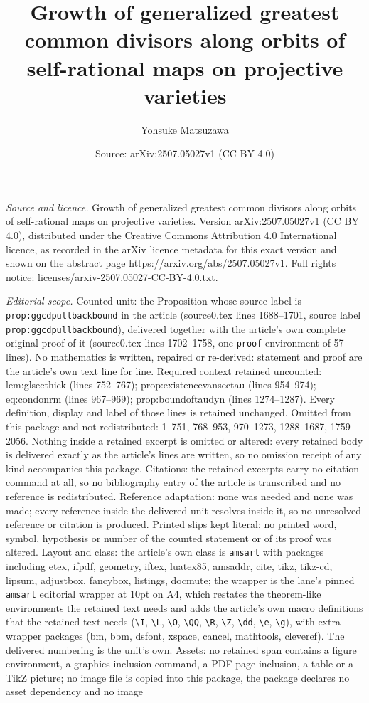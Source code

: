 \documentclass[10pt,a4paper]{amsart}
\title[Growth of generalized greatest common divisors along orbits ]{Growth of generalized greatest common divisors along orbits of self-rational maps on projective varieties}
\author{Yohsuke Matsuzawa}
\date{Source: arXiv:2507.05027v1 (CC BY 4.0)}
\begin{document}
\maketitle

\noindent\emph{Source and licence.} Growth of generalized greatest common divisors along orbits of self-rational maps on projective varieties. Version arXiv:2507.05027v1 (CC BY 4.0), distributed under the Creative Commons Attribution 4.0 International licence, as recorded in the arXiv licence metadata for this exact version and shown on the abstract page https://arxiv.org/abs/2507.05027v1. Full rights notice: licenses/arxiv-2507.05027-CC-BY-4.0.txt.\par\smallskip

\noindent\textit{Editorial scope.} Counted unit: the Proposition whose source label is \texttt{prop:ggcdpullbackbound} in the article (source0.tex lines 1688--1701, source label \texttt{prop:ggcdpullbackbound}), delivered together with the article's own complete original proof of it (source0.tex lines 1702--1758, one \texttt{proof} environment of 57 lines). No mathematics is written, repaired or re-derived: statement and proof are the article's own text line for line. Required context retained uncounted: lem:glsecthick (lines 752--767); prop:existencevansectau (lines 954--974); eq:condonrm (lines 967--969); prop:boundoftaudyn (lines 1274--1287). Every definition, display and label of those lines is retained unchanged. Omitted from this package and not redistributed: 1--751, 768--953, 970--1273, 1288--1687, 1759--2056. Nothing inside a retained excerpt is omitted or altered: every retained body is delivered exactly as the article's lines are written, so no omission receipt of any kind accompanies this package. Citations: the retained excerpts carry no citation command at all, so no bibliography entry of the article is transcribed and no reference is redistributed. Reference adaptation: none was needed and none was made; every reference inside the delivered unit resolves inside it, so no unresolved reference or citation is produced. Printed slips kept literal: no printed word, symbol, hypothesis or number of the counted statement or of its proof was altered. Layout and class: the article's own class is \texttt{amsart} with packages including etex, ifpdf, geometry, iftex, luatex85, amsaddr, cite, tikz, tikz-cd, lipsum, adjustbox, fancybox, listings, docmute; the wrapper is the lane's pinned \texttt{amsart} editorial wrapper at 10pt on A4, which restates the theorem-like environments the retained text needs and adds the article's own macro definitions that the retained text needs (\texttt{\textbackslash I}, \texttt{\textbackslash L}, \texttt{\textbackslash O}, \texttt{\textbackslash QQ}, \texttt{\textbackslash R}, \texttt{\textbackslash Z}, \texttt{\textbackslash dd}, \texttt{\textbackslash e}, \texttt{\textbackslash g}), with extra wrapper packages (bm, bbm, dsfont, xspace, cancel, mathtools, cleveref). The delivered numbering is the unit's own. Assets: no retained span contains a figure environment, a graphics-inclusion command, a PDF-page inclusion, a table or a TikZ picture; no image file is copied into this package, the package declares no asset dependency and no image 
\end{document}
